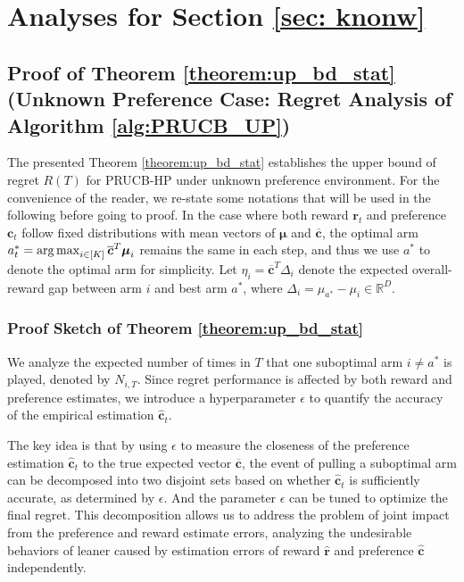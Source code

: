 \section{Analyses for Section \ref{sec: knonw}}

\subsection{Proof of Theorem \ref{theorem:up_bd_stat} (Unknown Preference Case: Regret Analysis of Algorithm \ref{alg:PRUCB_UP})}
\label{sec:app_up_bd_stat}


The presented Theorem \ref{theorem:up_bd_stat} establishes the upper bound of regret $R(T)$ for PRUCB-HP under unknown preference environment.
For the convenience of the reader, we re-state some notations that will be used in the following before going to proof.
In the case where both reward $\boldsymbol{r}_t$ and preference $\boldsymbol{c}_t$ follow fixed distributions with mean vectors of $\boldsymbol{\mu}$ and $\boldsymbol{\overline{c}}$, the optimal arm 
$a^{*}_{t} = \operatorname*{arg\,max}_{i \in [K]} \boldsymbol{\overline{c}}^T \boldsymbol{\mu}_i $ 
remains the same in each step, and thus we use $a^{*}$ to denote the optimal arm for simplicity.
Let 
$\eta_{i} = \boldsymbol{\overline{c}}^{T} \Delta_{i} $ 
denote the expected overall-reward gap between arm $i$ and best arm $a^{*}$,
where
$\Delta_{i} = \mu_{a^{*}} - \mu_{i} \in \mathbb{R}^D$.

\subsubsection{Proof Sketch of Theorem \ref{theorem:up_bd_stat}}
\label{sec:app_pr_sketch_up_bd_stat}

We analyze the expected number of times in $T$ that one suboptimal arm $i \neq a^*$ is played, denoted by $N_{i,T}$.
Since regret performance is affected by both reward and preference estimates, we introduce a hyperparameter $\epsilon$ to quantify the accuracy of the empirical estimation $\boldsymbol{\hat{c}}_t$.

The key idea is that by using $\epsilon$ to measure the closeness of the preference estimation $\hat{\boldsymbol{c}}_t$ to the true expected vector $\overline{\boldsymbol{c}}$, the event of pulling a suboptimal arm can be decomposed into two disjoint sets based on whether $\hat{\boldsymbol{c}}_t$ is sufficiently accurate, as determined by  $\epsilon$. And the parameter $\epsilon$ can be tuned to optimize the final regret.
This decomposition allows us to address the problem of joint impact from the preference and reward estimate errors,  analyzing the undesirable behaviors of leaner caused by estimation errors of reward $\boldsymbol{\hat{r}}$ and preference $\boldsymbol{\hat{c}}$ independently. 

